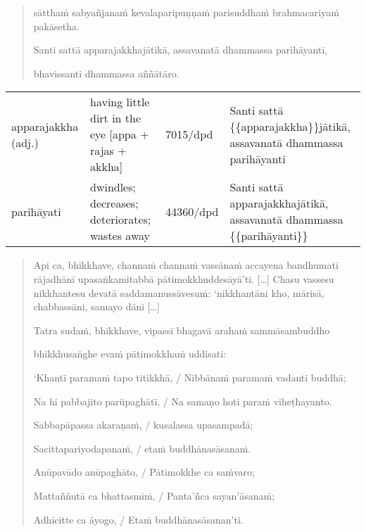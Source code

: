 \documentclass[11pt,oneside]{memoir}
\begin{document}
\clearpage
\casesLegendHeaderBGHere

\begin{quote}
sātthaṁ sabyañjanaṁ kevalaparipuṇṇaṁ parisuddhaṁ brahmacariyaṁ pakāsetha.

Santi sattā apparajakkhajātikā, assavanatā dhammassa parihāyanti,

bhavissanti dhammassa aññātāro.
\end{quote}

\begin{longtable}{L{\colOne} L{\colTwo} H H}
apparajakkha (adj.) & having little dirt in the eye [appa + rajas + akkha] & 7015/dpd & Santi sattā \{\{apparajakkha\}\}jātikā, assavanatā dhammassa parihāyanti\\[0pt]
parihāyati & dwindles; decreases; deteriorates; wastes away & 44360/dpd & Santi sattā apparajakkhajātikā, assavanatā dhammassa \{\{parihāyanti\}\}\\[0pt]
\end{longtable}

\vspace*{-1.5\baselineskip}
\enlargethispage*{2\baselineskip}

\begin{quote}
Api ca, bhikkhave, channaṁ channaṁ vassānaṁ accayena bandhumatī rājadhānī
upasaṅkamitabbā pātimokkhuddesāyā’ti. [\ldots{}] Chasu vassesu nikkhantesu devatā
saddamanussāvesuṁ: ‘nikkhantāni kho, mārisā, chabbassāni, samayo dāni [\ldots{}]

Tatra sudaṁ, bhikkhave, vipassī bhagavā arahaṁ sammāsambuddho

bhikkhusaṅghe evaṁ pātimokkhaṁ uddisati:

‘Khantī paramaṁ tapo titikkhā, / Nibbānaṁ paramaṁ vadanti buddhā;

Na hi pabbajito parūpaghātī, / Na samaṇo hoti paraṁ viheṭhayanto.

Sabbapāpassa akaraṇaṁ, / kusalassa upasampadā;

Sacittapariyodapanaṁ, / etaṁ buddhānasāsanaṁ.

Anūpavādo anūpaghāto, / Pātimokkhe ca saṁvaro;

Mattaññutā ca bhattasmiṁ, / Panta'ñca sayan'āsanaṁ;

Adhicitte ca āyogo, / Etaṁ buddhānasāsanan’ti.
\end{quote}

\vspace*{-1pt}
\end{document}
